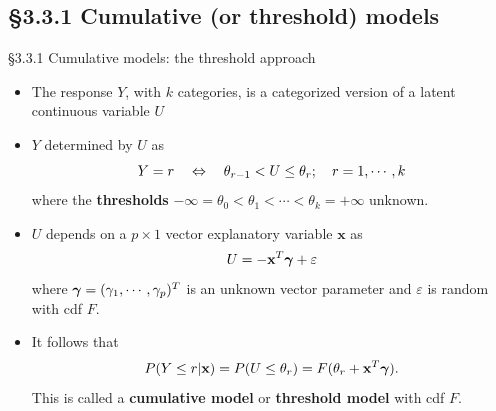 \documentclass{beamer}
\newcommand{\currentsubsection}{}
\let\oldsubsection\subsection
\renewcommand{\subsection}[1]{\oldsubsection{#1}\renewcommand{\currentsubsection}{#1}}
\begin{document}
%
%

\subsection{\S3.3.1 Cumulative (or threshold) models} \label{sec:3.3.1}
\begin{frame}{\S3.3.1 Cumulative models: the threshold approach}
\begin{itemize}
\item
The response $Y$, with $k$ categories, is a categorized version  of a latent continuous variable $U$
\item
$Y$ determined by $U$ as \vspace*{-3pt}
$$Y=r \quad\Leftrightarrow\quad \theta_{r-1}<U\leq \theta_r; \quad r=1,\cdots,k \vspace*{-3pt}$$ 
where the {\bf thresholds} $-\infty=\theta_0<\theta_1<\cdots <\theta_k=+\infty$ unknown.

\item
$U$ depends on a $p\times 1$ vector explanatory variable $\textbf{x}$ as \vspace*{-5pt}
$$U=-\textbf{x}^T\mbox{\boldmath $\gamma$}+\varepsilon$$
where $\mbox{\boldmath $\gamma$}=(\gamma_1,\cdots,\gamma_p)^T$ is an unknown vector
parameter and $\varepsilon$ is random with cdf $F$.

\item It follows that \vspace*{-5pt}
$$P(Y\leq r |\textbf{x})=P(U\leq \theta_r)=F(\theta_r+\textbf{x}^T\mbox{\boldmath $\gamma$}). \vspace*{-3pt}$$
This is called a \textbf{cumulative model} or \textbf{threshold model} with cdf $F$.

\end{itemize}
\end{frame}
\end{document}
